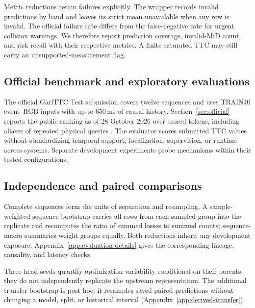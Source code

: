Metric reductions retain failures explicitly. The wrapper records invalid predictions by band and leaves its strict mean unavailable when any row is invalid. The official failure rate differs from the false-negative rate for urgent collision warnings. We therefore report prediction coverage, invalid-MiD count, and risk recall with their respective metrics. A finite saturated TTC may still carry an unsupported-measurement flag.

\subsection{Official benchmark and exploratory evaluations}



The official GarlTTC Test submission covers twelve sequences and uses TRAIN40 event--RGB inputs with up to 650\,ms of causal history. Section~\ref{sec:official} reports the public ranking as of 28 October 2026 over \OfficialSampleCount{} scored tokens, including aliases of repeated physical queries \citep{codabench2026}. The evaluator scores submitted TTC values without standardizing temporal support, localization, supervision, or runtime across systems. Separate development experiments probe mechanisms within their tested configurations. 

\subsection{Independence and paired comparisons}
Complete sequences form the units of separation and resampling. A sample-weighted sequence bootstrap carries all rows from each sampled group into the replicate and recomputes the ratio of summed losses to summed counts; sequence-macro summaries weight groups equally. Both reductions inherit any development exposure. Appendix~\ref{app:evaluation-details} gives the corresponding lineage, causality, and latency checks. 

Three head seeds quantify optimization variability conditional on their parents; they do not independently replicate the upstream representation. The additional transfer bootstrap is post hoc: it resamples saved paired predictions without changing a model, split, or historical interval (Appendix~\ref{app:derived-transfer}).
\FloatBarrier
